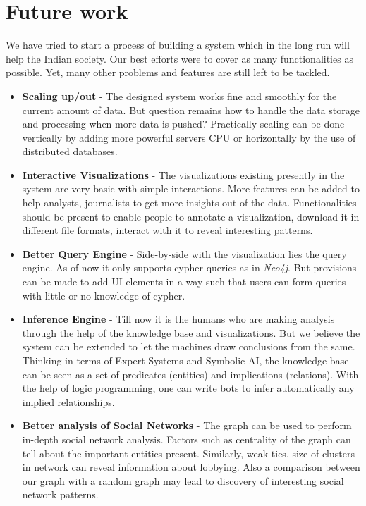 \section{Future work}
We have tried to start a process of building a system which in the long run will help the Indian society. Our best efforts were to cover as many functionalities as possible. Yet, many other problems and features are still left to be tackled.
\begin{itemize}
\item \textbf{Scaling up/out} - The designed system works fine and smoothly for the current amount of data. But question remains how to handle the data storage and processing when more data is pushed? Practically scaling can be done vertically by adding more powerful servers CPU or horizontally by the use of distributed databases.

\item \textbf{Interactive Visualizations} - The visualizations existing presently in the system are very basic with simple interactions. More features can be added to help analysts, journalists to get more insights out of the data. Functionalities should be present to enable people to annotate a visualization, download it in different file formats, interact with it to reveal interesting patterns.

\item \textbf{Better Query Engine} - Side-by-side with the visualization lies the query engine. As of now it only supports cypher queries as in \emph{Neo4j}. But provisions can be made to add UI elements in a way such that users can form queries with little or no knowledge of cypher.

\item \textbf{Inference Engine} - Till now it is the humans who are making analysis through the help of the knowledge base and visualizations. But we believe the system can be extended to let the machines draw conclusions from the same. Thinking in terms of Expert Systems and Symbolic AI, the knowledge base can be seen as a set of predicates (entities) and implications (relations). With the help of logic programming, one can write bots to infer automatically any implied relationships.

\item \textbf{Better analysis of Social Networks} - The graph can be used to perform in-depth social network analysis. Factors such as centrality of the graph can tell about the important entities present. Similarly, weak ties, size of clusters in network can reveal information about lobbying. Also a comparison between our graph with a random graph may lead to discovery of interesting social network patterns.


\end{itemize}
